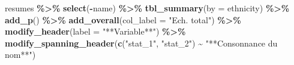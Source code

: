 \documentclass[
  11pt,
]{book}
\newenvironment{Shaded}{\begin{snugshade}}{\end{snugshade}}
\newcommand{\AttributeTok}[1]{\textcolor[rgb]{0.13,0.29,0.53}{#1}}
\newcommand{\FunctionTok}[1]{\textcolor[rgb]{0.13,0.29,0.53}{\textbf{#1}}}
\newcommand{\NormalTok}[1]{#1}
\newcommand{\SpecialCharTok}[1]{\textcolor[rgb]{0.81,0.36,0.00}{\textbf{#1}}}
\newcommand{\StringTok}[1]{\textcolor[rgb]{0.31,0.60,0.02}{#1}}
\numberwithin{equation}{section}
\numberwithin{countremarque}{section}
\begin{document}
\begin{Shaded}
\begin{Highlighting}[]
\NormalTok{resumes }\SpecialCharTok{\%\textgreater{}\%}
  \FunctionTok{select}\NormalTok{(}\SpecialCharTok{{-}}\NormalTok{name) }\SpecialCharTok{\%\textgreater{}\%} 
  \FunctionTok{tbl\_summary}\NormalTok{(}\AttributeTok{by =}\NormalTok{ ethnicity) }\SpecialCharTok{\%\textgreater{}\%} 
  \FunctionTok{add\_p}\NormalTok{() }\SpecialCharTok{\%\textgreater{}\%} 
  \FunctionTok{add\_overall}\NormalTok{(}\AttributeTok{col\_label =} \StringTok{"Ech. total"}\NormalTok{) }\SpecialCharTok{\%\textgreater{}\%} 
  \FunctionTok{modify\_header}\NormalTok{(}\AttributeTok{label =} \StringTok{"**Variable**"}\NormalTok{) }\SpecialCharTok{\%\textgreater{}\%} 
  \FunctionTok{modify\_spanning\_header}\NormalTok{(}\FunctionTok{c}\NormalTok{(}\StringTok{"stat\_1"}\NormalTok{, }\StringTok{"stat\_2"}\NormalTok{) }\SpecialCharTok{\textasciitilde{}} \StringTok{"**Consonnance du nom**"}\NormalTok{)}
\end{Highlighting}
\end{Shaded}
\end{document}
